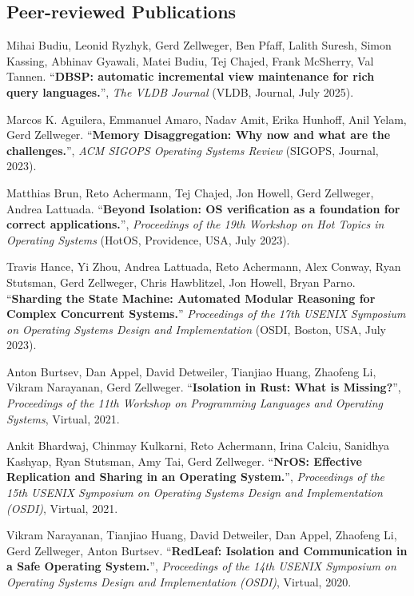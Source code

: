 \documentclass[margin,line]{cv/cv}
\begin{document}
\begin{resume}
    \pagebreak

    \section{\mysidestyle Peer-reviewed Publications}

    Mihai Budiu, Leonid Ryzhyk, Gerd Zellweger, Ben Pfaff, Lalith Suresh, Simon Kassing, Abhinav Gyawali, Matei Budiu, Tej Chajed, Frank McSherry, Val Tannen.
    ``\textbf{DBSP: automatic incremental view maintenance for rich query languages.}'',
    \textsl{The VLDB Journal} (VLDB, Journal, July 2025).

    Marcos K. Aguilera, Emmanuel Amaro, Nadav Amit, Erika Hunhoff, Anil Yelam, Gerd Zellweger.
    ``\textbf{Memory Disaggregation: Why now and what are the challenges.}'',
    \textsl{ACM SIGOPS Operating Systems Review} (SIGOPS, Journal, 2023).

    Matthias Brun, Reto Achermann, Tej Chajed, Jon Howell, Gerd Zellweger, Andrea Lattuada.
    ``\textbf{Beyond Isolation: OS verification as a foundation for correct applications.}'',
    \textsl{Proceedings of the 19th Workshop on Hot Topics in Operating Systems} (HotOS, Providence, USA, July 2023).

    Travis Hance, Yi Zhou, Andrea Lattuada, Reto Achermann, Alex Conway, Ryan Stutsman, Gerd Zellweger, Chris Hawblitzel, Jon Howell, Bryan Parno.
    ``\textbf{Sharding the State Machine: Automated Modular Reasoning for Complex Concurrent Systems.}''
    \textsl{Proceedings of the 17th USENIX Symposium on Operating Systems Design and Implementation} (OSDI, Boston, USA, July 2023).

    Anton Burtsev, Dan Appel, David Detweiler, Tianjiao Huang, Zhaofeng Li, Vikram Narayanan, Gerd Zellweger.
    ``\textbf{Isolation in Rust: What is Missing?}'', \textsl{Proceedings of the 11th Workshop on Programming Languages and Operating Systems}, Virtual, 2021.

    Ankit Bhardwaj, Chinmay Kulkarni, Reto Achermann, Irina Calciu, Sanidhya Kashyap, Ryan Stutsman, Amy Tai, Gerd Zellweger.
    ``\textbf{NrOS: Effective Replication and Sharing in an Operating System.}'', \textsl{Proceedings of the 15th USENIX Symposium on Operating Systems Design and Implementation (OSDI)}, Virtual, 2021.

    Vikram Narayanan, Tianjiao Huang, David Detweiler, Dan Appel, Zhaofeng Li, Gerd Zellweger, Anton Burtsev.
    ``\textbf{RedLeaf: Isolation and Communication in a Safe Operating System.}'', \textsl{Proceedings of the 14th USENIX Symposium on Operating Systems Design and Implementation (OSDI)}, Virtual, 2020.


\end{resume}
\end{document}
